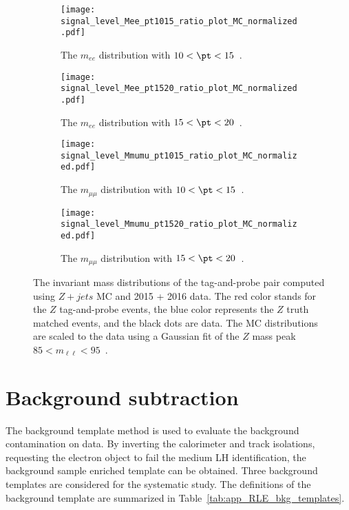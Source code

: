 \begin{figure}[htbp]
    \begin{subfigure}[b]{0.48\textwidth}
        \begin{center}
            \texttt{[image: signal\_level\_Mee\_pt1015\_ratio\_plot\_MC\_normalized.pdf]}
            \caption{The $m_{ee}$ distribution with $10 < \pt < 15$~{\GeV}.}
        \end{center}
    \end{subfigure}%
    \begin{subfigure}[b]{0.48\textwidth}
        \begin{center}
            \texttt{[image: signal\_level\_Mee\_pt1520\_ratio\_plot\_MC\_normalized.pdf]}
            \caption{The $m_{ee}$ distribution with $15 < \pt < 20$~{\GeV}.}
        \end{center}
    \end{subfigure}
    \begin{subfigure}[b]{0.48\textwidth}
        \begin{center}
            \texttt{[image: signal\_level\_Mmumu\_pt1015\_ratio\_plot\_MC\_normalized.pdf]}
            \caption{The $m_{\mu\mu}$ distribution with $10 < \pt < 15$~{\GeV}.}
        \end{center}
    \end{subfigure}%
    \begin{subfigure}[b]{0.48\textwidth}
        \begin{center}
            \texttt{[image: signal\_level\_Mmumu\_pt1520\_ratio\_plot\_MC\_normalized.pdf]}
            \caption{The $m_{\mu\mu}$ distribution with $15 < \pt < 20$~{\GeV}.}
        \end{center}
    \end{subfigure}
    \caption{The invariant mass distributions of the tag-and-probe pair computed using $Z+jets$ MC and 2015 + 2016 data.
    The red color stands for the $Z$ tag-and-probe events, the blue color represents the $Z$ truth matched events, and the black dots are data.
    The MC distributions are scaled to the data using a Gaussian fit of the $Z$ mass peak $85 < m_{\ell \ell} < 95$~{\GeV}.}
    \label{fig:app_RLE_mll_distributions}
\end{figure}


\section{Background subtraction}
\label{sec:app_RLE_bkg_subtraction}
The background template method is used to evaluate the background contamination on data.
By inverting the calorimeter and track isolations, requesting the electron object to fail the medium LH identification, the background sample enriched template can be obtained.
Three background templates are considered for the systematic study.
The definitions of the background template are summarized in Table~\ref{tab:app_RLE_bkg_templates}.

